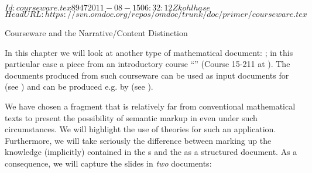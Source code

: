\svnInfo $Id: courseware.tex 8947 2011-08-15 06:32:12Z kohlhase $
\svnKeyword $HeadURL: https://svn.omdoc.org/repos/omdoc/trunk/doc/primer/courseware.tex $

\begin{omgroup}[id=courseware]{Courseware and the Narrative/Content Distinction}

  In this chapter we will look at another type of mathematical document:
  {}; in this particular case a piece from an introductory course
  ``{}'' (Course 15-211 at {}). The {\omdoc} documents produced from such courseware can be
  used as input documents for {\activemath} (see {}) and can
  be produced e.g. by {\cpoint} (see {}).

\begin{myfig}{15-211}{Three slides from 15-211}
  }\quad
  \fbox{\texttt{[image: \\figuresPath\{slide-862]}}}\\[1ex]
  \fbox{\texttt{[image: \\figuresPath\{slide-863]}}}\quad
  \fbox{\texttt{[image: \\figuresPath\{slide-864]}}}
\end{myfig}

We have chosen a fragment that is relatively far from conventional mathematical
texts to present the possibility of semantic markup in {\omdoc} even under such
circumstances.  We will highlight the use of {\omdoc} theories for
such an application. Furthermore, we will take seriously the difference between
marking up the knowledge (implicitly) contained in the {s} and the
{} as a structured
document. As a consequence, we will capture the slides in {\emph{two}} documents:


\end{omgroup}
